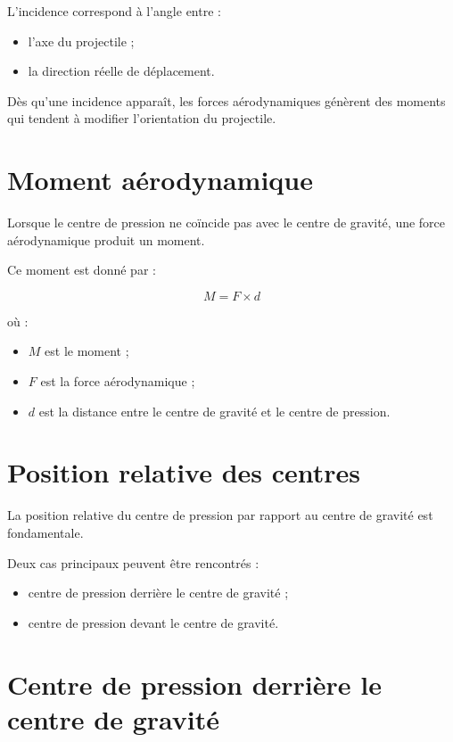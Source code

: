 L'incidence correspond à l'angle entre :

\begin{itemize}
    \item l'axe du projectile ;
    \item la direction réelle de déplacement.
\end{itemize}

Dès qu'une incidence apparaît, les forces aérodynamiques génèrent des
moments qui tendent à modifier l'orientation du projectile.

\section{Moment aérodynamique}

Lorsque le centre de pression ne coïncide pas avec le centre de gravité,
une force aérodynamique produit un moment.

Ce moment est donné par :

\begin{equation}
M = F \times d
\end{equation}

où :

\begin{itemize}
    \item $M$ est le moment ;
    \item $F$ est la force aérodynamique ;
    \item $d$ est la distance entre le centre de gravité et le centre de
          pression.
\end{itemize}

\section{Position relative des centres}

La position relative du centre de pression par rapport au centre de gravité
est fondamentale.

Deux cas principaux peuvent être rencontrés :

\begin{itemize}
    \item centre de pression derrière le centre de gravité ;
    \item centre de pression devant le centre de gravité.
\end{itemize}

\section{Centre de pression derrière le centre de gravité}

